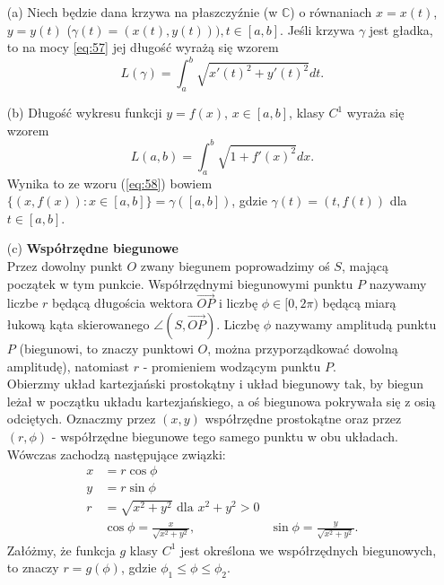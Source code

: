 \documentclass[leqno]{article}
\begin{document}
\begin{justify}
\begin{uwaga}
    \begin{itemize}
        \item [(a)] 
            Niech będzie dana krzywa na płaszczyźnie (w $\mathbb{C}$) o równaniach
            $x = x(t)$, $y = y(t)$ ($\gamma(t) = (x(t), y(t))), t \in [a,b]$. Jeśli krzywa $\gamma$ jest gładka, to na mocy
            \ref{eq:57} jej długość wyrażą się wzorem
            \begin{equation}\label{eq:58}
                L(\gamma) = \int_{a}^{b}\sqrt{x'(t)^2 + y'(t)^2}dt.
            \end{equation}
        \item [(b)] 
            Długość wykresu funkcji $y = f(x)$, $x \in [a,b]$, klasy $C^1$ wyraża się wzorem
            \[
                L(a,b) = \int_{a}^{b}\sqrt{1 + f'(x)^2}dx.
            \]
            Wynika to ze wzoru (\ref{eq:58}) bowiem $\{(x, f(x)) : x \in [a,b]\} = \gamma([a,b])$, gdzie
            $\gamma(t)=(t, f(t))$ dla $t \in [a,b]$. 
        \item [(c)]
            \textbf{Współrzędne biegunowe} \\
            Przez dowolny punkt $O$ zwany biegunem poprowadzimy oś $S$, mającą początek w tym punkcie.
            Współrzędnymi biegunowymi punktu $P$ nazywamy liczbe $r$ będącą długościa wektora $\overrightarrow{OP}$ i liczbę
            $\phi \in [0, 2\pi)$ będącą miarą łukową kąta skierowanego $\angle{(S, \overrightarrow{OP})}$. Liczbę $\phi$ nazywamy amplitudą
            punktu $P$ (biegunowi, to znaczy punktowi $O$, można przyporządkować dowolną amplitudę), natomiast $r$ - promieniem wodzącym punktu $P$. \\
            Obierzmy układ kartezjański prostokątny i układ biegunowy tak, by biegun leżał w początku układu kartezjańskiego, a oś biegunowa pokrywała się z osią odciętych.
            Oznaczmy przez $(x, y)$ współrzędne prostokątne oraz przez $(r, \phi)$ - współrzędne biegunowe tego samego punktu w obu układach. Wówczas zachodzą następujące związki:
            \begin{align*}
                x &= r\cos \phi \\
                y &= r \sin \phi \\
                r &= \sqrt{x^2+y^2} \text{ dla } x^2 + y^2 > 0 \\
                & \cos \phi = \frac{x}{\sqrt{x^2+y^2}}, & \sin \phi = \frac{y}{\sqrt{x^2+y^2}}.
            \end{align*}
            Załóżmy, że funkcja $g$ klasy $C^1$ jest określona we współrzędnych biegunowych, to znaczy $r = g(\phi)$, gdzie $\phi_1 \leqslant \phi \leqslant \phi_2$. 

\end{itemize}
\end{uwaga}
\end{justify}
\end{document}
